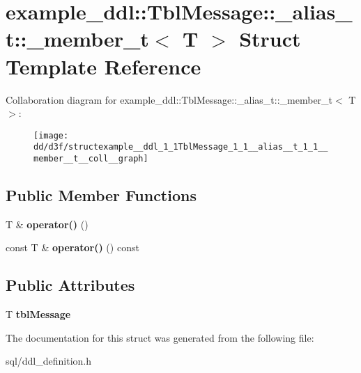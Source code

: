 \hypertarget{structexample__ddl_1_1TblMessage_1_1__alias__t_1_1__member__t}{}\section{example\+\_\+ddl\+:\+:Tbl\+Message\+:\+:\+\_\+alias\+\_\+t\+:\+:\+\_\+member\+\_\+t$<$ T $>$ Struct Template Reference}
\label{structexample__ddl_1_1TblMessage_1_1__alias__t_1_1__member__t}


Collaboration diagram for example\+\_\+ddl\+:\+:Tbl\+Message\+:\+:\+\_\+alias\+\_\+t\+:\+:\+\_\+member\+\_\+t$<$ T $>$\+:
\nopagebreak
\begin{figure}[H]
\begin{center}
\leavevmode
\texttt{[image: dd/d3f/structexample\_\_ddl\_1\_1TblMessage\_1\_1\_\_alias\_\_t\_1\_1\_\_member\_\_t\_\_coll\_\_graph]}
\end{center}
\end{figure}
\subsection*{Public Member Functions}
\begin{DoxyCompactItemize}
\item 
\hypertarget{structexample__ddl_1_1TblMessage_1_1__alias__t_1_1__member__t_aa992e843e9ae3e94c680f4810bb1823d}{}T \& {\bfseries operator()} ()\label{structexample__ddl_1_1TblMessage_1_1__alias__t_1_1__member__t_aa992e843e9ae3e94c680f4810bb1823d}

\item 
\hypertarget{structexample__ddl_1_1TblMessage_1_1__alias__t_1_1__member__t_a656182a13304bac84c96948a8adb119d}{}const T \& {\bfseries operator()} () const \label{structexample__ddl_1_1TblMessage_1_1__alias__t_1_1__member__t_a656182a13304bac84c96948a8adb119d}

\end{DoxyCompactItemize}
\subsection*{Public Attributes}
\begin{DoxyCompactItemize}
\item 
\hypertarget{structexample__ddl_1_1TblMessage_1_1__alias__t_1_1__member__t_a8ae0279ef1812d612a03412941b3764a}{}T {\bfseries tbl\+Message}\label{structexample__ddl_1_1TblMessage_1_1__alias__t_1_1__member__t_a8ae0279ef1812d612a03412941b3764a}

\end{DoxyCompactItemize}


The documentation for this struct was generated from the following file\+:\begin{DoxyCompactItemize}
\item 
sql/ddl\+\_\+definition.\+h\end{DoxyCompactItemize}
